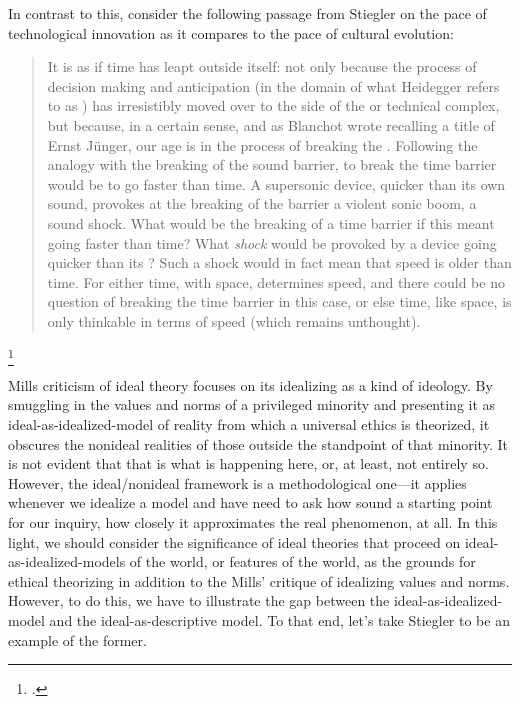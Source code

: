\documentclass[letterpaper,notitlepage,12pt]{article}
\begin{document}
In contrast to this, consider the following passage from Stiegler on the pace of
technological innovation as it compares to the pace of cultural evolution:
\blockquote{It is as if time has leapt outside itself: not only because the
  process of decision making and anticipation (in the domain of what Heidegger
  refers to as ) has irresistibly moved over to the side of
  the  or technical complex, but because, in a certain sense,
  and as Blanchot wrote recalling a title of Ernst J\"{u}nger, our age is in the
  process of breaking the . Following the analogy with
  the breaking of the sound barrier, to break the time barrier would be to go
  faster than time. A supersonic device, quicker than its own sound, provokes at
  the breaking of the barrier a violent sonic boom, a sound shock. What would be
  the breaking of a time barrier if this meant going faster than time? What
  \textit{shock} would be provoked by a device going quicker than its
  ? Such a shock would in fact mean that speed is older than
  time. For either time, with space, determines speed, and there could be no
  question of breaking the time barrier in this case, or else time, like space,
is only thinkable in terms of speed (which remains
unthought).}\footcite{stiegler_technics_1998}

Mills criticism of ideal theory focuses on its idealizing as a kind of ideology.
By smuggling in the values and norms of a privileged minority and presenting it
as ideal-as-idealized-model of reality from which a universal ethics is
theorized, it obscures the nonideal realities of those outside the standpoint of
that minority.
It is not evident that that is what is happening here, or, at least, not
entirely so.
However, the ideal/nonideal framework is a methodological one---it applies
whenever we idealize a model and have need to ask how sound a starting point for
our inquiry, how closely it approximates the real phenomenon, at all.
In this light, we should consider the significance of ideal theories that
proceed on ideal-as-idealized-models of the world, or features of the world, as
the grounds for ethical theorizing in addition to the Mills' critique of
idealizing values and norms.
However, to do this, we have to illustrate the gap between the
ideal-as-idealized-model and the ideal-as-descriptive model.
To that end, let's take Stiegler to be an example of the former.
\end{document}
